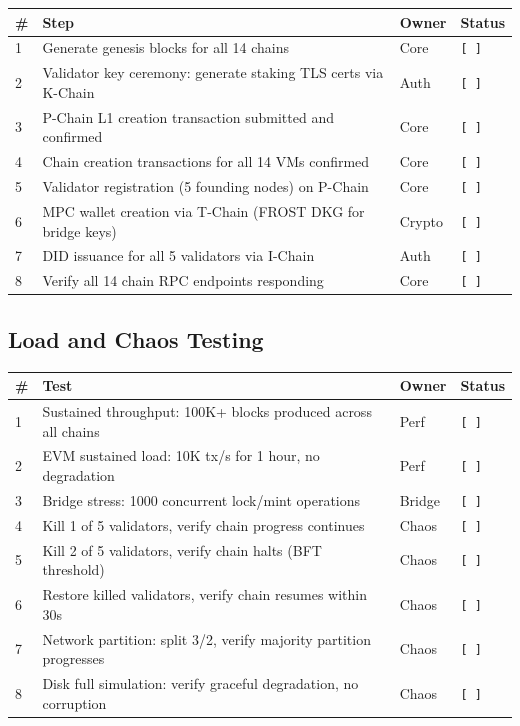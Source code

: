 \documentclass[11pt,letterpaper]{article}
\newcommand{\pending}{\texttt{[ ]}}
\begin{document}
\begin{tabularx}{\textwidth}{@{}l X l l@{}}
\toprule
\textbf{\#} & \textbf{Step} & \textbf{Owner} & \textbf{Status} \\
\midrule
1  & Generate genesis blocks for all 14 chains                    & Core   & \pending \\
2  & Validator key ceremony: generate staking TLS certs via K-Chain & Auth   & \pending \\
3  & P-Chain L1 creation transaction submitted and confirmed       & Core   & \pending \\
4  & Chain creation transactions for all 14 VMs confirmed          & Core   & \pending \\
5  & Validator registration (5 founding nodes) on P-Chain          & Core   & \pending \\
6  & MPC wallet creation via T-Chain (FROST DKG for bridge keys)   & Crypto & \pending \\
7  & DID issuance for all 5 validators via I-Chain                 & Auth   & \pending \\
8  & Verify all 14 chain RPC endpoints responding                  & Core   & \pending \\
\bottomrule
\end{tabularx}

\subsection{Load and Chaos Testing}

\begin{tabularx}{\textwidth}{@{}l X l l@{}}
\toprule
\textbf{\#} & \textbf{Test} & \textbf{Owner} & \textbf{Status} \\
\midrule
1 & Sustained throughput: 100K+ blocks produced across all chains    & Perf & \pending \\
2 & EVM sustained load: 10K tx/s for 1 hour, no degradation         & Perf & \pending \\
3 & Bridge stress: 1000 concurrent lock/mint operations              & Bridge & \pending \\
4 & Kill 1 of 5 validators, verify chain progress continues          & Chaos & \pending \\
5 & Kill 2 of 5 validators, verify chain halts (BFT threshold)      & Chaos & \pending \\
6 & Restore killed validators, verify chain resumes within 30s       & Chaos & \pending \\
7 & Network partition: split 3/2, verify majority partition progresses & Chaos & \pending \\
8 & Disk full simulation: verify graceful degradation, no corruption  & Chaos & \pending \\
\bottomrule
\end{tabularx}
\end{document}
